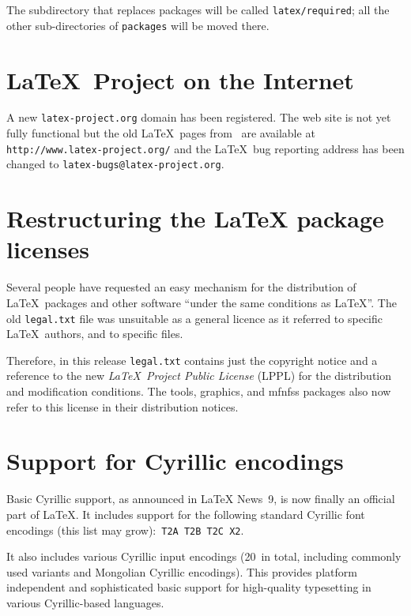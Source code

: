\documentclass{ltnews}
\providecommand\file[1]{\texttt{#1}}
\begin{document}
  The subdirectory that replaces \textsf{packages} will be called
  \file{latex/required}; all the other sub-directories of
  \file{packages} will be moved there.

\vspace{17pt}
\pagebreak

 \section{\LaTeX\ Project on the Internet}
A new \texttt{latex-project.org} domain has been registered.
The web site is not yet fully functional but the old \LaTeX\ pages from
\ctan\ are available at \texttt{http://www.latex-project.org/} and the
\LaTeX\ bug reporting address has been changed to
\texttt{latex-bugs@latex-project.org}.

  \section{Restructuring the \LaTeX{} package licenses}

Several people have requested an easy mechanism for the distribution
of \LaTeX\ packages and other software ``under the same conditions as
\LaTeX''.  The old \file{legal.txt} file was unsuitable as a general
licence as it referred to specific \LaTeX\ authors, and to specific
files.

Therefore, in this release \file{legal.txt} contains just the
copyright notice and a reference to the new \emph{\LaTeX\ Project
Public License} (LPPL) for the distribution and modification
conditions. The \textsf{tools}, \textsf{graphics}, and \textsf{mfnfss}
packages also now refer to this license in their distribution notices.

  \section{Support for Cyrillic encodings}

Basic Cyrillic support, as announced in \LaTeX{} News~9, is now
finally an official part of \LaTeX{}.  It includes support for the
following standard Cyrillic font encodings (this list may
grow):~\mbox{\texttt{T2A T2B T2C X2}}.

It also includes various Cyrillic input encodings (20~in total,
including commonly used variants and Mongolian Cyrillic
encodings). This provides platform independent and
sophisticated basic support for high-quality typesetting in various
Cyrillic-based languages.
\end{document}
